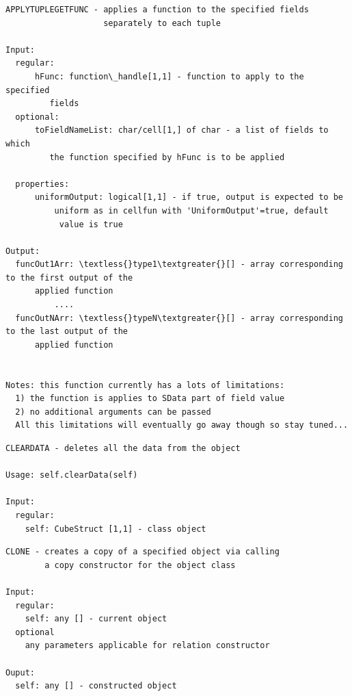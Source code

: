 \documentclass[letterpaper,10pt,english]{sphinxmanual}
\begin{document}
\label{chap_func:smartdb-relations-atypifiedstaticrelation-applytuplegetfunc}
\begin{Verbatim}[commandchars=\\\{\}]
APPLYTUPLEGETFUNC - applies a function to the specified fields
                    separately to each tuple

Input:
  regular:
      hFunc: function\_handle[1,1] - function to apply to the specified
         fields
  optional:
      toFieldNameList: char/cell[1,] of char - a list of fields to which
         the function specified by hFunc is to be applied

  properties:
      uniformOutput: logical[1,1] - if true, output is expected to be
          uniform as in cellfun with 'UniformOutput'=true, default
           value is true

Output:
  funcOut1Arr: \textless{}type1\textgreater{}[] - array corresponding to the first output of the
      applied function
          ....
  funcOutNArr: \textless{}typeN\textgreater{}[] - array corresponding to the last output of the
      applied function


Notes: this function currently has a lots of limitations:
  1) the function is applies to SData part of field value
  2) no additional arguments can be passed
  All this limitations will eventually go away though so stay tuned...
\end{Verbatim}
\label{chap_func:smartdb-relations-atypifiedstaticrelation-cleardata}
\begin{Verbatim}[commandchars=\\\{\}]
CLEARDATA - deletes all the data from the object

Usage: self.clearData(self)

Input:
  regular:
    self: CubeStruct [1,1] - class object
\end{Verbatim}
\label{chap_func:smartdb-relations-atypifiedstaticrelation-clone}
\begin{Verbatim}[commandchars=\\\{\}]
CLONE - creates a copy of a specified object via calling
        a copy constructor for the object class

Input:
  regular:
    self: any [] - current object
  optional
    any parameters applicable for relation constructor

Ouput:
  self: any [] - constructed object
\end{Verbatim}
\label{chap_func:smartdb-relations-atypifiedstaticrelation-copyfrom}
\end{document}
